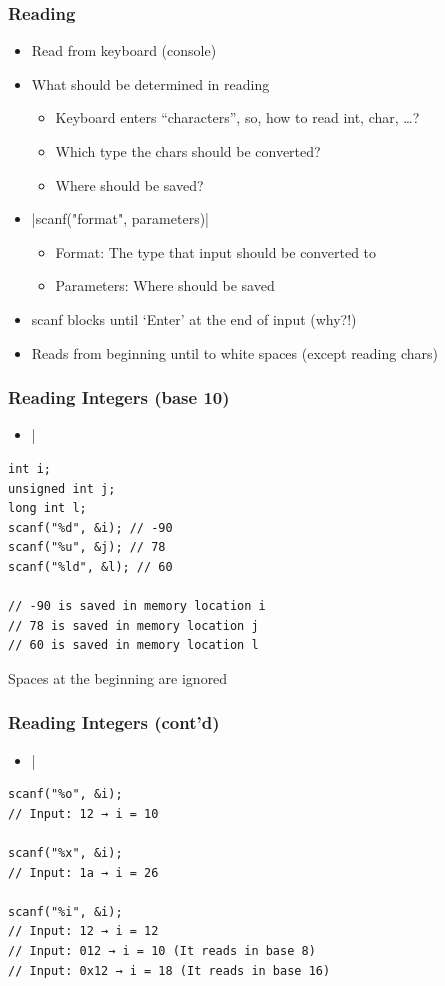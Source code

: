 \documentclass{../c-lecture}
\begin{document}
\begin{frame}[fragile]
  \frametitle{Reading}
  \begin{itemize}
    \item Read from keyboard (console)
    \item What should be determined in reading
    \begin{itemize}
      \item Keyboard enters ``characters'', so, how to read int, char, …?
      \item Which type the chars should be converted?
      \item Where should be saved?
    \end{itemize}
    \item {}|scanf("format", parameters)|
    \begin{itemize}
      \item Format: The type that input should be converted to
      \item Parameters: Where should be saved
    \end{itemize}
    \item scanf blocks until ‘Enter’ at the end of input (why?!)
    \item Reads from beginning until to white spaces (except reading chars)
  \end{itemize}
\end{frame}

\begin{frame}[fragile]
  \frametitle{Reading Integers (base 10)}
  \begin{itemize}
    \item {}|%
  \end{itemize}
  \begin{verbatim}
int i;
unsigned int j;
long int l;
scanf("%d", &i); // -90
scanf("%u", &j); // 78
scanf("%ld", &l); // 60

// -90 is saved in memory location i
// 78 is saved in memory location j
// 60 is saved in memory location l

  \end{verbatim}
  \begin{block}{}
  Spaces at the beginning are ignored
  \end{block}
\end{frame}

\begin{frame}[fragile]
  \frametitle{Reading Integers (cont’d)}
  \begin{itemize}
    \item {}|%
  \end{itemize}
  \begin{verbatim}
scanf("%o", &i);
// Input: 12 → i = 10

scanf("%x", &i);
// Input: 1a → i = 26

scanf("%i", &i);
// Input: 12 → i = 12
// Input: 012 → i = 10 (It reads in base 8)
// Input: 0x12 → i = 18 (It reads in base 16)
  \end{verbatim}
\end{frame}
\end{document}
